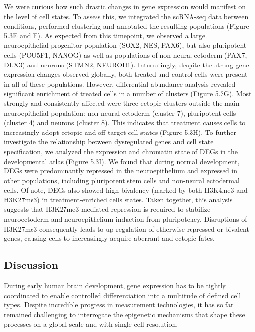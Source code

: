 We were curious how such drastic changes in gene expression would manifest on the level of cell states. To assess this, we integrated the scRNA-seq data between conditions, performed clustering and annotated the resulting populations (Figure 5.3E and F). As expected from this timepoint, we  observed a large neuroepithelial progenitor population (SOX2, NES, PAX6), but also pluripotent cells (POU5F1, NANOG) as well as populations of non-neural ectoderm (PAX7, DLX3) and neurons (STMN2, NEUROD1). Interestingly, despite the strong gene expression changes observed globally, both treated and control cells were present in all of these populations. However, differential abundance analysis revealed significant enrichment of treated cells in a number of clusters (Figure 5.3G). Most strongly and consistently affected were three ectopic clusters outside the main neuroepithelial population: non-neural ectoderm (cluster 7), pluripotent cells (cluster 4) and neurons (cluster 8). This indicates that treatment causes cells to increasingly adopt ectopic and off-target cell states (Figure 5.3H). To further investigate the relationship between dysregulated genes and cell state specification, we analyzed the expression and chromatin state of DEGs in the developmental atlas (Figure 5.3I). We found that during normal development, DEGs were predominantly repressed in the neuroepithelium and expressed in other populations, including pluripotent stem cells and non-neural ectodermal cells. Of note, DEGs also showed high bivalency (marked by both H3K4me3 and H3K27me3) in treatment-enriched cells states. Taken together, this analysis suggests that H3K27me3-mediated repression is required to stabilize neuroectoderm and neuroepithelium induction from pluripotency. Disruptions of H3K27me3 consequently leads to up-regulation of otherwise repressed or bivalent genes, causing cells to increasingly acquire aberrant and ectopic fates. 


\subsection{Discussion}
During early human brain development, gene expression has to be tightly coordinated to enable controlled differentiation into a multitude of defined cell types. Despite incredible progress in measurement technologies, it has so far remained challenging to interrogate the epigenetic mechanisms that shape these processes on a global scale and with single-cell resolution. 

